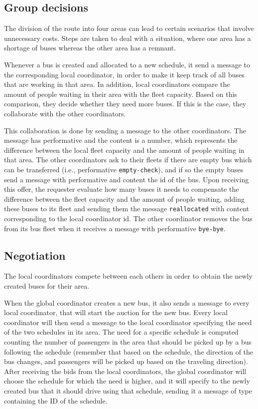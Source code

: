 \subsection{Group decisions}

The division of the route into four areas can lead to certain scenarios that involve unnecessary costs. Steps are taken to deal with a situation, where one area has a shortage of buses whereas the other area has a remnant. 

Whenever a bus is created and allocated to a new schedule, it send a message to the corresponding local coordinator, in order to make it keep track of all buses that are working in that area. In addition, local coordinators compare the amount of people waiting in their area with the fleet capacity. Based on this comparison, they decide whether they need more buses. If this is the case, they collaborate with the other coordinators. 

This collaboration is done by sending a message to the other coordinators. The message has performative  and the content is a number, which represents the difference between the local fleet capacity and the amount of people waiting in that area. The other coordinators ask to their fleets if there are empty bus which can be transferred (i.e., performative \texttt{empty-check}), and if so the empty buses send a message with performative  and content the id of the bus. Upon receiving this offer, the requester evaluate how many buses it needs to compensate the difference between the fleet capacity and the amount of people waiting, adding these buses to its fleet and sending them the message \texttt{reallocated} with content corresponding to the local coordinator id. The other coordinator removes the bus from its bus fleet when it receives a message with performative \texttt{bye-bye}.

\subsection{Negotiation}
\label{subsec:negotiations}

The local coordinators compete between each others in order to obtain the newly created buses for their area.

When the global coordinator creates a new bus, it also sends a message  to every local coordinator, that will start the auction for the new bus. Every local coordinator will then send a message  to the local coordinator specifying the need of the two schedules in its area. The need for a specific schedule is computed counting the number of passengers in the area that should be picked up by a bus following the schedule (remember that based on the schedule, the direction of the bus changes, and passengers will be picked up based on the traveling direction). After receiving the bids from the local coordinators, the global coordinator will choose the schedule for which the need is higher, and it will specify to the newly created bus that it should drive using that schedule, sending it a message of type  containing the ID of the schedule.

